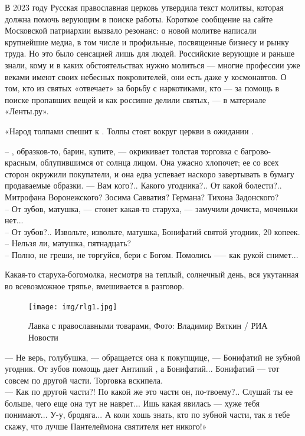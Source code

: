 В 2023 году Русская православная церковь утвердила текст молитвы, которая должна помочь верующим в поиске работы. Короткое сообщение на сайте Московской патриархии вызвало резонанс: о новой молитве написали крупнейшие медиа, в том числе и профильные, посвященные бизнесу и рынку труда. Но это было сенсацией лишь для  людей. Российские верующие и раньше знали, кому и в каких обстоятельствах нужно молиться --- многие профессии уже веками имеют своих небесных покровителей, они есть даже у космонавтов. О том, кто из святых «отвечает» за борьбу с наркотиками, кто --- за помощь в поиске пропавших вещей и как россияне делили святых, --- в материале «Ленты.ру».

«Народ толпами спешит к . Толпы стоят вокруг церкви в ожидании .

-- , образков-то, барин, купите, --- окрикивает толстая торговка с багрово-красным, облупившимся от солнца лицом. Она ужасно хлопочет; ее со всех сторон окружили покупатели, и она едва успевает наскоро завертывать в бумагу продаваемые образки. — Вам кого?.. Какого угодника?.. От какой болести?.. Митрофана Воронежского? Зосима Савватия? Германа? Тихона Задонского?\\
-- От зубов, матушка, — стонет какая-то старуха, — замучили дочиста, моченьки нет...\\
-- От зубов?.. Извольте, извольте, матушка, Бонифатий святой угодник, 20 копеек.\\
-- Нельзя ли, матушка, пятнадцать?\\
-- Полно, не греши, не торгуйся, бери с Богом. Помолись --— как рукой снимет...

Какая-то старуха-богомолка, несмотря на теплый, солнечный день, вся укутанная во всевозможное тряпье, вмешивается в разговор.

\begin{figure}[h]
    \centering
    \texttt{[image: img/rlg1.jpg]}
    \caption{Лавка с православными товарами, Фото: Владимир Вяткин / РИА Новости}
\end{figure}

--- Не верь, голубушка, —  обращается она к покупщице, — Бонифатий не зубной угодник. От зубов помощь дает Антипий , а Бонифатий... Бонифатий --- тот совсем по другой части.
Торговка вскипела.\\
--- Как по другой части?! По какой же это части он, по-твоему?.. Слушай ты ее больше, чего еще она тут не наврет... Ишь какая явилась --- хуже тебя понимают... У-у, бродяга... А коли хошь знать, кто по зубной части, так я тебе скажу, что лучше Пантелеймона святителя нет никого!»

